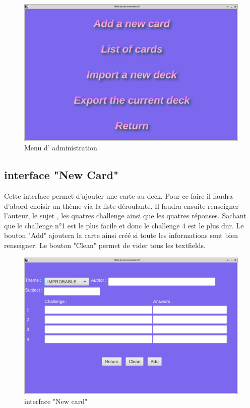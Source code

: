 \begin{figure}[h]
	\centering
	\includegraphics[width=\textwidth]{admin.png}
	\caption{Menu d' administration}
	\label{fig:menu_administration}
\end{figure}

\newpage
\subsection{interface "New Card"}
Cette interface permet d'ajouter une carte au deck. Pour ce faire il faudra d'abord choisir un thème via la 
liste déroulante. Il faudra ensuite renseigner l'auteur, le sujet , les quatres challenge ainsi que les 
quatres réponses. Sachant que le challenge n°1 est le plus facile et donc le challenge 4 est le plus dur.
Le bouton "Add" ajoutera la carte ainsi créé si toute les informations sont bien renseigner. Le bouton "Clean" permet de vider tous les textfields.

\begin{figure}[h]
	\centering
	\includegraphics[width=\textwidth]{newcard.png}
	\caption{interface "New card"}
	\label{fig:new_card}
\end{figure}

